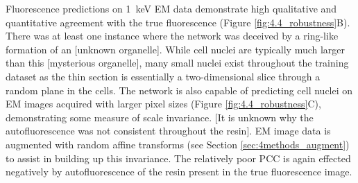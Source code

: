 Fluorescence predictions on \SI{1}{\kilo\electronvolt} EM data demonstrate high qualitative and quantitative agreement with the true fluorescence (Figure \ref{fig:4.4_robustness}B). There was at least one instance where the network was deceived by a ring-like formation of an [unknown organelle]. While cell nuclei are typically much larger than this [mysterious organelle], many small nuclei exist throughout the training dataset as the thin section is essentially a two-dimensional slice through a random plane in the cells.
The network is also capable of predicting cell nuclei on EM images acquired with larger pixel sizes (Figure \ref{fig:4.4_robustness}C), demonstrating some measure of scale invariance. [It is unknown why the autofluorescence was not consistent throughout the resin]. EM image data is augmented with random affine transforms (see Section \ref{sec:4methods_augment}) to assist in building up this invariance. The relatively poor PCC is again effected negatively by autofluorescence of the resin present in the true fluorescence image.



